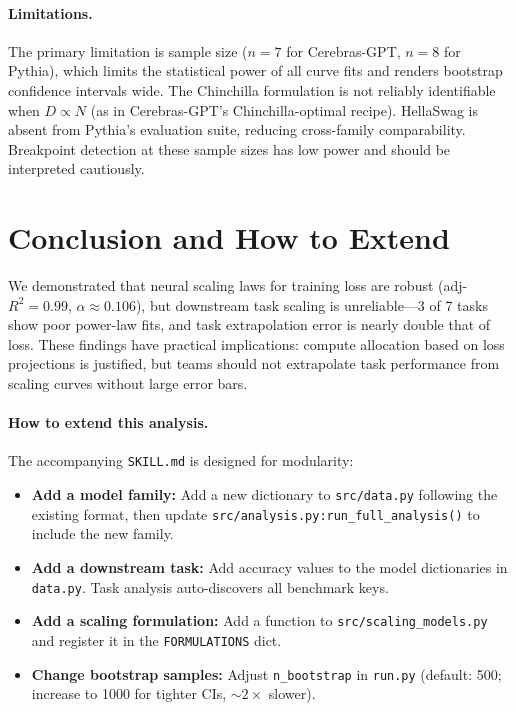 \documentclass[11pt]{article}
\begin{document}
\paragraph{Limitations.}
The primary limitation is sample size ($n = 7$ for Cerebras-GPT, $n = 8$ for Pythia), which limits the statistical power of all curve fits and renders bootstrap confidence intervals wide.
The Chinchilla formulation is not reliably identifiable when $D \propto N$ (as in Cerebras-GPT's Chinchilla-optimal recipe).
HellaSwag is absent from Pythia's evaluation suite, reducing cross-family comparability.
Breakpoint detection at these sample sizes has low power and should be interpreted cautiously.

\section{Conclusion and How to Extend}

We demonstrated that neural scaling laws for training loss are robust (adj-$R^2 = 0.99$, $\alpha \approx 0.106$), but downstream task scaling is unreliable---3 of 7 tasks show poor power-law fits, and task extrapolation error is nearly double that of loss.
These findings have practical implications: compute allocation based on loss projections is justified, but teams should not extrapolate task performance from scaling curves without large error bars.

\paragraph{How to extend this analysis.}
The accompanying \texttt{SKILL.md} is designed for modularity:
\begin{itemize}
  \item \textbf{Add a model family:} Add a new dictionary to \texttt{src/data.py} following the existing format, then update \texttt{src/analysis.py:run\_full\_analysis()} to include the new family.
  \item \textbf{Add a downstream task:} Add accuracy values to the model dictionaries in \texttt{data.py}. Task analysis auto-discovers all benchmark keys.
  \item \textbf{Add a scaling formulation:} Add a function to \texttt{src/scaling\_models.py} and register it in the \texttt{FORMULATIONS} dict.
  \item \textbf{Change bootstrap samples:} Adjust \texttt{n\_bootstrap} in \texttt{run.py} (default: 500; increase to 1000 for tighter CIs, ${\sim}2\times$ slower).
\end{itemize}
\end{document}
